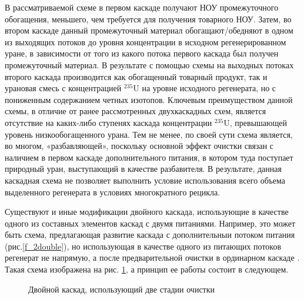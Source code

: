 В рассматриваемой схеме в первом каскаде получают НОУ промежуточного обогащения, меньшего, чем требуется для получения товарного НОУ. Затем, во втором каскаде данный промежуточный материал обогащают/обедняют в одном из выходящих потоков до уровня концентрации в исходном регенерированном уране, в зависимости от того из какого потока первого каскада был получен промежуточный материал. В результате с помощью схемы на выходных потоках второго каскада производится как обогащенный товарный продукт, так и урановая смесь с концентрацией $^{235}$U на уровне исходного регенерата, но с пониженным содержанием четных изотопов. Ключевым преимуществом данной схемы, в отличие от ранее рассмотренных двухкаскадных схем, является отсутствие на каких-либо ступенях каскада концентрации $^{235}$U, превышающей уровень низкообогащенного урана.
Тем не менее, по своей сути схема является, во многом, «разбавляющей», поскольку основной эффект очистки связан с наличием в первом каскаде дополнительного питания, в котором туда поступает природный уран, выступающий в качестве разбавителя. В результате, данная каскадная схема не позволяет выполнить условие использования всего объема выделенного регенерата в условиях многократного рецикла.



Существуют и иные модификации двойного каскада, использующие в качестве одного из составных элементов каскад с двумя питаниями. Например, это может быть схема, предлагающая развитие каскада с дополнительныи потоком питания (рис.\ref{f_2double}), но использующая в качестве одного из питающих потоков регенерат не напрямую, а после предварительной очистки в ординарном каскаде \cite{palkinOchistkaRegenerirovannogoGeksaftorida2013}. Такая схема изображена на рис. \ref{fig:double_palk}, а принцип ее работы состоит в следующем.

\begin{figure}[ht]
  \caption{Двойной каскад, использующий две стадии очистки}\label{fig:double_palk}
\end{figure}

